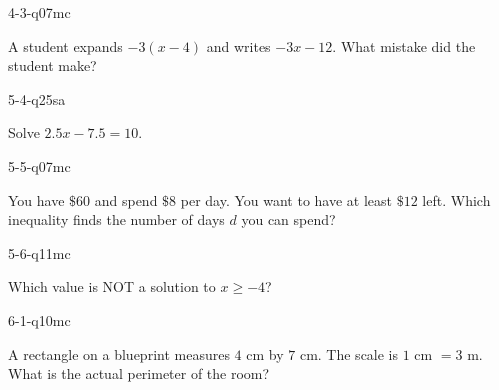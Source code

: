 \begin{practiceQuestion}{4-3-q07}{mc}
\begin{questionText}
A student expands $-3(x - 4)$ and writes $-3x - 12$. What mistake did the student make?
\end{questionText}
\end{practiceQuestion}

\begin{practiceQuestion}{5-4-q25}{sa}
\begin{questionText}
Solve $2.5x - 7.5 = 10$.
\end{questionText}
\end{practiceQuestion}

\begin{practiceQuestion}{5-5-q07}{mc}
\begin{questionText}
You have $\$60$ and spend $\$8$ per day. You want to have at least $\$12$ left. Which inequality finds the number of days $d$ you can spend?
\end{questionText}
\end{practiceQuestion}

\begin{practiceQuestion}{5-6-q11}{mc}
\begin{questionText}
Which value is NOT a solution to $x \geq -4$?
\end{questionText}
\end{practiceQuestion}

\begin{practiceQuestion}{6-1-q10}{mc}
\begin{questionText}
A rectangle on a blueprint measures $4$ cm by $7$ cm. The scale is $1$ cm $= 3$ m. What is the actual perimeter of the room?
\end{questionText}
\end{practiceQuestion}

